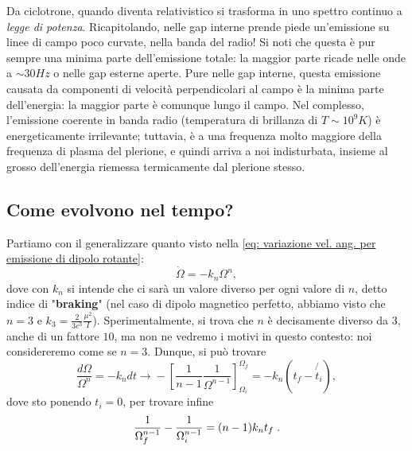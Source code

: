 Da ciclotrone, quando diventa relativistico si trasforma in uno spettro continuo a \textit{legge di potenza}.
Ricapitolando, nelle gap interne prende piede un'emissione su linee di campo poco curvate, nella banda del radio!
Si noti che questa è pur sempre una minima parte dell'emissione totale:
la maggior parte ricade nelle onde a $\sim30Hz$ o nelle gap esterne aperte.
Pure nelle gap interne, questa emissione causata da componenti di velocità perpendicolari al campo è la minima parte dell'energia: la maggior parte è comunque lungo il campo. 
Nel complesso, l'emissione coerente in banda radio (temperatura di brillanza di $T\sim10^9K$) è energeticamente irrilevante; tuttavia, è a una frequenza molto maggiore della frequenza di plasma del plerione, e quindi arriva a noi indisturbata, insieme al grosso dell'energia riemessa termicamente dal plerione stesso.


\subsection{Come evolvono nel tempo?}
Partiamo con il generalizzare quanto visto nella \eqref{eq: variazione vel. ang. per emissione di dipolo rotante}:
\begin{equation}
    \dot{\Omega}=-k_n\Omega^n,
    \label{eq: generalizzazione variazione Omega}
\end{equation}
dove con $k_n$ si intende che ci sarà un valore diverso per ogni valore di $n$, detto indice di "\textbf{braking}" (nel caso di dipolo magnetico perfetto, abbiamo visto che $n=3$ e $k_3=\frac{2}{3c^3}\frac{\mu^2}{I}$).
Sperimentalmente, si trova che $n$ è decisamente diverso da $3$, anche di un fattore $10$, ma non ne vedremo i motivi in questo contesto: noi considereremo come se $n=3$.
Dunque, si può trovare
\begin{equation}
    \frac{d\Omega}{\Omega^n}=-k_ndt \xrightarrow{} -\left[ \frac{1}{n-1}\frac{1}{\Omega^{n-1}} \right]_{\Omega_i}^{\Omega_f} = -k_n(t_f-\not {t_i}),
\end{equation}
dove sto ponendo $t_i =0 $, per trovare infine
\begin{equation}
    \frac{1}{\Omega_f^{n-1}} - \frac{1}{\Omega_i^{n-1}}= (n-1)k_nt_f\hspace{1mm}.
    \label{eq: evoluzione temporale velocità angolare}
\end{equation}

